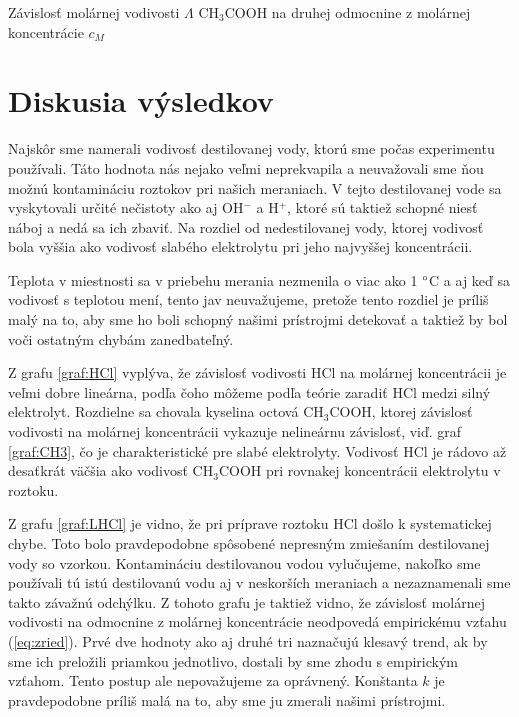 \documentclass{article}
\begin{document}
\begin{graph}[H]
		\centering
		
		\caption{Závislosť molárnej vodivosti $\Lambda$ CH$_3$COOH na druhej odmocnine z molárnej koncentrácie $c_M$}
		\label{graf:CH3L}
\end{graph}

\section{Diskusia výsledkov}
Najskôr sme namerali vodivosť destilovanej vody, ktorú sme počas experimentu používali. Táto hodnota nás nejako veľmi neprekvapila a neuvažovali sme ňou možnú kontamináciu roztokov pri našich meraniach. V tejto destilovanej vode sa vyskytovali určité nečistoty ako aj OH$^-$ a H$^+$, ktoré sú taktiež schopné niesť náboj a nedá sa ich zbaviť. Na rozdiel od nedestilovanej vody, ktorej vodivosť bola vyššia ako vodivosť slabého elektrolytu pri jeho najvyššej koncentrácii. 

Teplota v miestnosti sa v priebehu merania nezmenila o viac ako 1 $\degree$C a aj keď sa vodivosť s teplotou mení, tento jav neuvažujeme, pretože tento rozdiel je príliš malý na to, aby sme ho boli schopný našimi prístrojmi detekovať a taktiež by bol voči ostatným chybám zanedbateľný. 

Z grafu \ref{graf:HCl} vyplýva, že závislosť vodivosti HCl na molárnej koncentrácii je veľmi dobre lineárna, podľa čoho môžeme podľa teórie zaradiť HCl medzi silný elektrolyt. Rozdielne sa chovala kyselina octová CH$_3$COOH, ktorej závislosť vodivosti na molárnej koncentrácii vykazuje nelineárnu závislosť, viď. graf \ref{graf:CH3}, čo je charakteristické pre slabé elektrolyty. Vodivosť HCl je rádovo až desaťkrát väčšia ako vodivosť CH$_3$COOH pri rovnakej koncentrácii elektrolytu v roztoku.

Z grafu \ref{graf:LHCl} je vidno, že pri príprave roztoku HCl došlo k systematickej chybe. Toto bolo pravdepodobne spôsobené nepresným zmiešaním destilovanej vody so vzorkou. Kontamináciu destilovanou vodou vylučujeme, nakoľko sme  používali tú istú destilovanú vodu aj v neskorších meraniach a nezaznamenali sme takto závažnú odchýlku. Z tohoto grafu je taktiež vidno, že závislosť molárnej vodivosti na odmocnine z molárnej koncentrácie neodpovedá empirickému vzťahu (\ref{eq:zried}). Prvé dve hodnoty ako aj druhé tri naznačujú klesavý trend, ak by sme ich preložili priamkou jednotlivo, dostali by sme zhodu s empirickým vzťahom. Tento postup ale nepovažujeme za oprávnený. Konštanta $k$ je pravdepodobne príliš malá na to, aby sme ju zmerali našimi prístrojmi.
\end{document}
